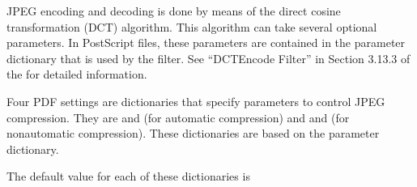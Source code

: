 \documentclass[letterpaper,12pt,english,openany,oneside]{sphinxmanual}
\begin{document}
JPEG encoding and decoding is done by means of the direct cosine transformation (DCT) algorithm. This algorithm can take several optional parameters. In PostScript files, these parameters are contained in the  parameter dictionary that is used by the  filter. See “DCTEncode Filter” in Section 3.13.3 of the  for detailed information.

Four PDF settings are dictionaries that specify parameters to control JPEG compression. They are  and  (for automatic compression) and  and  (for non\sphinxhyphen{}automatic compression). These dictionaries are based on the  parameter dictionary.

The default value for each of these dictionaries is

\begin{sphinxVerbatim}[commandchars=\\\{\}]
   \PYG{p}{[}   \PYG{p}{]}  \PYG{p}{[}   \PYG{p}{]}
\end{sphinxVerbatim}
\end{document}
